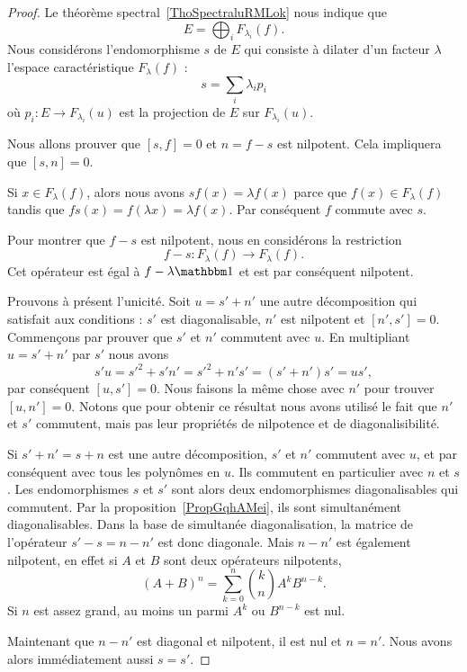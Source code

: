 \begin{proof}
    Le théorème spectral~\ref{ThoSpectraluRMLok} nous indique que
    \begin{equation}
        E=\bigoplus_iF_{\lambda_i}(f).
    \end{equation}
    Nous considérons l'endomorphisme \( s\) de \( E\) qui consiste à dilater d'un facteur \( \lambda\) l'espace caractéristique \( F_{\lambda}(f)\) :
    \begin{equation}
        s=\sum_i\lambda_ip_i
    \end{equation}
    où \( p_i\colon E\to F_{\lambda_i}(u)\) est la projection de \( E\) sur \( F_{\lambda_i}(u)\).

    Nous allons prouver que \( [s,f]=0\) et \( n=f-s\) est nilpotent. Cela impliquera que \( [s,n]=0\).

    Si \( x\in F_{\lambda}(f)\), alors nous avons \( sf(x)=\lambda f(x)\) parce que \( f(x)\in F_{\lambda}(f)\) tandis que \( fs(x)=f(\lambda x)=\lambda f(x)\). Par conséquent \( f\) commute avec \( s\).

    Pour montrer que \( f-s\) est nilpotent, nous en considérons la restriction
    \begin{equation}
        f-s\colon F_{\lambda}(f)\to F_{\lambda}(f).
    \end{equation}
    Cet opérateur est égal à \( f-\lambda\mtu\) et est par conséquent nilpotent.

    Prouvons à présent l'unicité. Soit \( u=s'+n'\) une autre décomposition qui satisfait aux conditions : \( s'\) est diagonalisable, \( n'\) est nilpotent et \( [n',s']=0\). Commençons par prouver que \( s'\) et \( n'\) commutent avec \( u\). En multipliant \( u=s'+n'\) par \( s'\) nous avons
    \begin{equation}
        s'u=s'^2+s'n'=s'^2+n's'=(s'+n')s'=us',
    \end{equation}
    par conséquent \( [u,s']=0\). Nous faisons la même chose avec \( n'\) pour trouver \( [u,n']=0\). Notons que pour obtenir ce résultat nous avons utilisé le fait que \( n'\) et \( s'\) commutent, mais pas leur propriétés de nilpotence et de diagonalisibilité.


    Si \( s'+n'=s+n\) est une autre décomposition, \( s'\) et \( n'\) commutent avec \( u\), et par conséquent avec tous les polynômes en \( u\). Ils commutent en particulier avec \( n\) et \( s\). Les endomorphismes \( s\) et \( s'\) sont alors deux endomorphismes diagonalisables qui commutent. Par la proposition~\ref{PropGqhAMei}, ils sont simultanément diagonalisables. Dans la base de simultanée diagonalisation, la matrice de l'opérateur \( s'-s=n-n'\) est donc diagonale. Mais \( n-n'\) est également nilpotent, en effet si \( A\) et \( B\) sont deux opérateurs nilpotents,
    \begin{equation}
        (A+B)^n=\sum_{k=0}^n\binom{k}{n}A^kB^{n-k}.
    \end{equation}
    Si \( n\) est assez grand, au moins un parmi \( A^k\) ou \( B^{n-k}\) est nul.

    Maintenant que \( n-n'\) est diagonal et nilpotent, il est nul et \( n=n'\). Nous avons alors immédiatement aussi \( s=s'\).

\end{proof}

